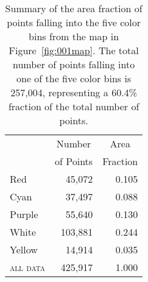 \documentclass[12pt,%
              twoside,
               letterpaper]{uiothesis}
\begin{document}
\begin{table}
  \centering 
  \begin{tabular}{lrr}
	
  		 &  
		\multicolumn{1}{c}{Number} & 
		\multicolumn{1}{c}{Area}   \\
		
		&  
		\multicolumn{1}{c}{of Points} & 
		\multicolumn{1}{c}{Fraction}   \\


		\cmidrule(lr){2-2}
    	\cmidrule(lr){3-3}
	
   		Red & 
		45,072 & 
		0.105 \\
		
		Cyan & 
		37,497 & 
		0.088 \\
		
		Purple & 
		55,640 & 
		0.130 \\
		
		White & 
		103,881 & 
		0.244 \\
		
		Yellow & 
		14,914 & 
		0.035 \\
		
		\textsc{all data} & 
		425,917 & 
		1.000 \\

	\end{tabular}
  	\caption[Summary of color area fractions from Figure~\ref{fig:001map}]{%
	Summary of the area fraction of points falling into the 
	five color bins from the map in Figure~\ref{fig:001map}. The total number of points falling
into one of the five color bins is 257,004, representing a 60.4\% fraction of the total
number of points.}
	\label{tab:sto001summary}
\end{table}
\end{document}
